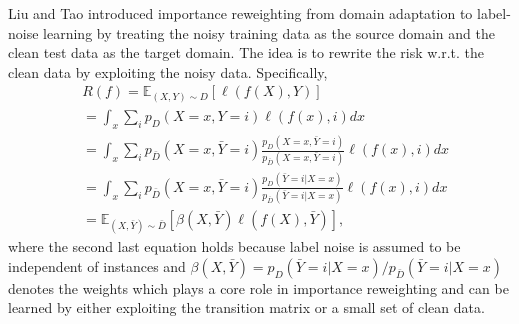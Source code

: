 Liu and Tao  introduced importance reweighting  from domain adaptation to label-noise learning by treating the noisy training data as the source domain and the clean test data as the target domain. The idea is to rewrite the risk w.r.t. the clean data by exploiting the noisy data. Specifically, 
\begin{align*}
\label{eq:importance}
&R(f)=\mathbb{E}_{(X,Y)\sim D}[\ell(f(X),Y)]\\
&=\int_{x}\sum_ip_D(X=x,Y=i)\ell(f(x),i)dx\nonumber\\
&=\int_{x}\sum_ip_{\bar{D}}(X=x,\bar{Y}=i)\frac{p_D(X=x,\bar{Y}=i)}{p_{\bar{D}}(X=x,\bar{Y}=i)}\ell(f(x),i)dx\nonumber\\
&=\int_{x}\sum_ip_{\bar{D}}(X=x,\bar{Y}=i)\frac{p_D(\bar{Y}=i|X=x)}{p_{\bar{D}}(\bar{Y}=i|X=x)}\ell(f(x),i)dx\\
&=\mathbb{E}_{(X,\bar{Y})\sim \bar{D}}[\beta(X,\bar{Y}){\ell}(f(X),\bar{Y})],\nonumber
\end{align*}
where the second last equation holds because label noise is assumed to be independent of instances and $\beta(X,\bar{Y})=p_D(\bar{Y}=i|X=x)/p_{\bar{D}}(\bar{Y}=i|X=x)$ denotes the weights which plays a core role in importance reweighting and can be learned by either exploiting the transition matrix or a small set of clean data.

